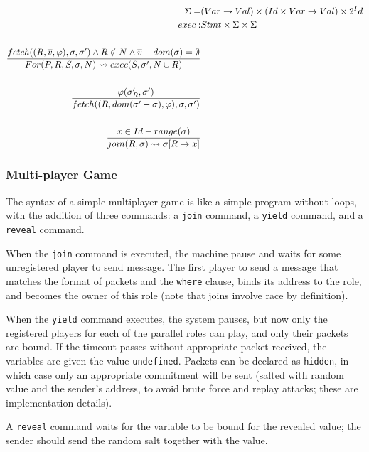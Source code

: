 \documentclass[acmsmall,review,anonymous]{acmart}\settopmatter{printfolios=true,printccs=false,printacmref=false}
\begin{document}
\begin{align*}
  \Sigma =& (Var \rightarrow Val) \times (Id \times Var \rightarrow Val) \times 2^Id \\
  exec :& Stmt \times \Sigma \times \Sigma \\
  \\
  fetch((R, \overline{v}, \varphi), \sigma, \sigma') \wedge R \notin N \wedge \overline{v} - dom(\sigma) = \emptyset \over{
  For(P, R, S, \sigma, N) \rightsquigarrow exec(S, \sigma', N\cup R)                                                 }\\
  \\
  \varphi(\sigma'_R, \sigma')                                \over{
  fetch((R, dom(\sigma'-\sigma), \varphi), \sigma, \sigma')   } \\
  \\
  x \in Id - range(\sigma)                                    \over{
  join(R, \sigma) \rightsquigarrow \sigma[R\mapsto x]         }
\end{align*}

\subsubsection{Multi-player Game}
The syntax of a simple multiplayer game is like a simple program without loops, with the addition of three commands: a \texttt{join} command, a \texttt{yield} command, and a \texttt{reveal} command.

When the \texttt{join} command is executed, the machine pause and waits for some unregistered player to send message. The first player to send a message that matches the format of packets and the \texttt{where} clause, binds its address to the role, and becomes the owner of this role (note that joins involve race by definition).

When the \texttt{yield} command executes, the system pauses, but now only the registered players for each of the parallel roles can play, and only their packets are bound. If the timeout passes without appropriate packet received, the variables are given the value \texttt{undefined}. Packets can be declared as \texttt{hidden}, in which case only an appropriate commitment will be sent (salted with random value and the sender's address, to avoid brute force and replay attacks; these are implementation details).

A \texttt{reveal} command waits for the variable to be bound for the revealed value; the sender should send the random salt together with the value.
\end{document}
